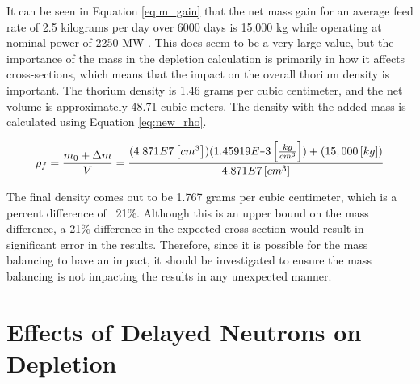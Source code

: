 It can be seen in Equation \eqref{eq:m_gain} that the net mass gain for an average feed rate of 2.5 kilograms per day over 6000 days is 15,000 kg \cite{rykhlevskii_fuel_2020, betzler_molten_2017} while operating at nominal power of 2250 MW \cite{robertson_conceptual_1971}. This does seem to be a very large value, but the importance of the mass in the depletion calculation is primarily in how it affects cross-sections, which means that the impact on the overall thorium density is important. The thorium density is 1.46 grams per cubic centimeter, and the net volume is approximately 48.71 cubic meters. The density with the added mass is calculated using Equation \eqref{eq:new_rho}.

\begin{equation} \hfill
\rho_f = \frac{m_0 + \Delta m}{V} = \frac{(4.871E7 \left[cm^3 \right])(1.45919E\minus3 \left[ \frac{kg}{cm^3} \right]) + (15,000 \left[ kg \right])}{4.871E7 \left[ cm^3 \right]} 
\hfill\label{eq:new_rho} \end{equation}

The final density comes out to be 1.767 grams per cubic centimeter, which is a percent difference of ~21\%. Although this is an upper bound on the mass difference, a 21\% difference in the expected cross-section would result in significant error in the results. Therefore, since it is possible for the mass balancing to have an impact, it should be investigated to ensure the mass balancing is not impacting the results in any unexpected manner.









\section{Effects of Delayed Neutrons on Depletion}

